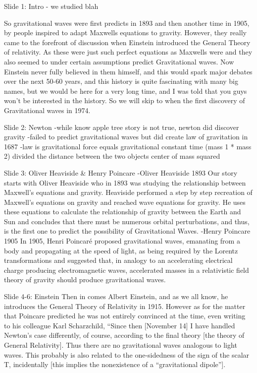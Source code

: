     Slide 1: Intro 
        - we studied blah



So gravitational waves were first predicts in 1893 and then another time in 1905, by people inspired to adapt Maxwells equations to gravity. However, they really came to the forefront of discussion when Einstein introduced the General Theory of relativity. As these were just such perfect equations as Maxwells were and they also seemed to under certain assumptions predict Gravitational waves. Now Einstein never fully believed in them himself, and this would spark major debates over the next 50-60 years, and this history is quite fascinating with many big names, but we would be here for a very long time, and I was told that you guys won't be interested in the history. So we will skip to when the first discovery of Gravitational waves in 1974.  



    
    Slide 2: Newton
        -while know apple tree story is not true, newton did discover gravity
        -failed to predict gravitational waves but did create law of gravitation in 1687
        -law is gravitational force equals gravitational constant time (mass 1 * mass 2) divided the distance between the two objects center of mass squared
    
    Slide 3: Oliver Heaviside & Henry Poincare
        -Oliver Heaviside 1893
        Our story starts with Oliver Heaviside who in 1893 was studying the relationship between Maxwell's equations and gravity. Heaviside performed a step by step recreation of Maxwell's equations on gravity and reached wave equations for gravity. He uses these equations to calculate the relationship of gravity between the Earth and Sun and concludes that there must be numerous orbital perturbations, and thus, is the first one to predict the possibility of Gravitational Waves.
        -Henry Poincare 1905
        In 1905, Henri Poincaré proposed gravitational waves, emanating from a body and propagating at the speed of light, as being required by the Lorentz transformations and suggested that, in analogy to an accelerating electrical charge producing electromagnetic waves, accelerated masses in a relativistic field theory of gravity should produce gravitational waves.
    
    
    Slide 4-6: Einstein
        Then in comes Albert Einstein, and as we all know, he introduces the General Theory of Relativity in 1915. However as for the matter that Poincare predicted he was not entirely convinced at the time, even writing to his colleague Karl Scharzchild, “Since then [November 14] I have handled Newton’s case differently, of course, according to the final theory [the theory of General Relativity]. Thus there are no gravitational waves analogous to light waves. This probably is also related to the one-sidedness of the sign of the scalar T, incidentally [this implies the nonexistence of a “gravitational dipole”].
    
